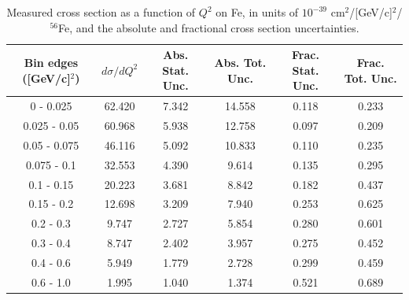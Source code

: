 \documentclass[aps,prl,twocolumn,superscriptaddress,nofootinbib]{revtex4-1}
\begin{document}
\begin{table}[h!]
  \centering
  \caption{Measured cross section as a function of $Q^{2}$ on Fe, in units of
  $10^{-39}$ $\text{cm}^{2}$/[GeV/c]$^{2}$/$^{56}$Fe, and the absolute and
  fractional cross section uncertainties.}
    \begin{tabular}{c||c||c|c||c|c}
      Bin edges ([GeV/c]$^{2}$)  &  $d\sigma/dQ^{2}$  &  Abs. Stat. Unc. & Abs. Tot. Unc.  &  Frac. Stat. Unc.  &  Frac. Tot. Unc. \\
      \hline\hline
         0 - 0.025 & 62.420 & 7.342 & 14.558 & 0.118 & 0.233 \\
      0.025 - 0.05 & 60.968 & 5.938 & 12.758 & 0.097 & 0.209 \\
      0.05 - 0.075 & 46.116 & 5.092 & 10.833 & 0.110 & 0.235 \\
       0.075 - 0.1 & 32.553 & 4.390 & 9.614 & 0.135 & 0.295 \\
        0.1 - 0.15 & 20.223 & 3.681 & 8.842 & 0.182 & 0.437 \\
        0.15 - 0.2 & 12.698 & 3.209 & 7.940 & 0.253 & 0.625 \\
         0.2 - 0.3 & 9.747 & 2.727 & 5.854 & 0.280 & 0.601 \\
         0.3 - 0.4 & 8.747 & 2.402 & 3.957 & 0.275 & 0.452 \\
         0.4 - 0.6 & 5.949 & 1.779 & 2.728 & 0.299 & 0.459 \\
         0.6 - 1.0 & 1.995 & 1.040 & 1.374 & 0.521 & 0.689 \\
    \end{tabular}
  \label{table:Q2XSec_Fe}
\end{table}
\end{document}
